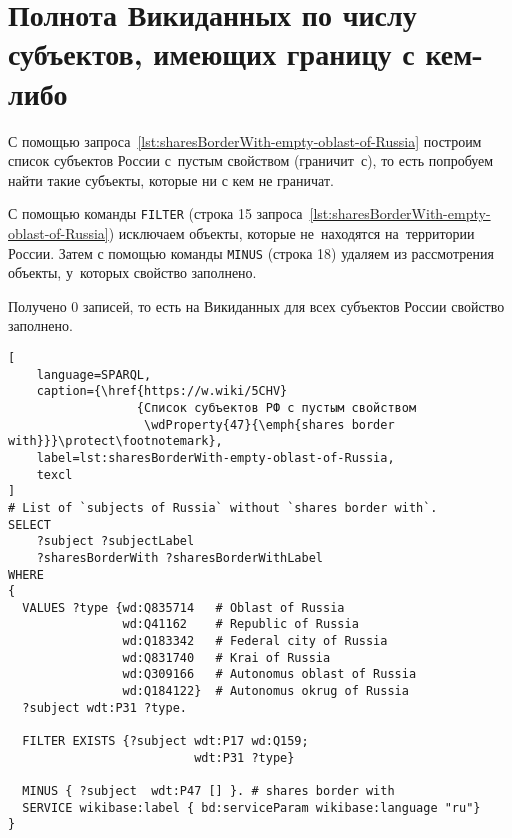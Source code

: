 \newpage
\section{Полнота Викиданных по числу субъектов, имеющих границу с кем-либо} 

С помощью запроса~\ref{lst:sharesBorderWith-empty-oblast-of-Russia} 
построим список субъектов России 
с~пустым свойством  (граничит~с), 
то есть попробуем найти такие субъекты, которые ни с кем не граничат.



С помощью команды \lstinline|FILTER| (строка 15 запроса~\ref{lst:sharesBorderWith-empty-oblast-of-Russia}) 
исключаем объекты, которые не~находятся на~территории России. 
Затем с помощью команды \lstinline|MINUS| (строка 18) удаляем из рассмотрения объекты, 
у~которых свойство  заполнено.

Получено 0 записей, то есть на Викиданных для всех субъектов России свойство  заполнено.

\lstset{numbers=left, firstnumber=1, frame=single}
\begin{lstlisting}[ 
    language=SPARQL, 
    caption={\href{https://w.wiki/5CHV}
                  {Список субъектов РФ с пустым свойством 
                   \wdProperty{47}{\emph{shares border with}}}\protect\footnotemark},
    label=lst:sharesBorderWith-empty-oblast-of-Russia,
    texcl 
]
# List of `subjects of Russia` without `shares border with`. 
SELECT 
    ?subject ?subjectLabel 
    ?sharesBorderWith ?sharesBorderWithLabel
WHERE
{
  VALUES ?type {wd:Q835714   # Oblast of Russia
                wd:Q41162    # Republic of Russia
                wd:Q183342   # Federal city of Russia
                wd:Q831740   # Krai of Russia
                wd:Q309166   # Autonomus oblast of Russia
                wd:Q184122}  # Autonomus okrug of Russia
  ?subject wdt:P31 ?type.
  
  FILTER EXISTS {?subject wdt:P17 wd:Q159; 
                          wdt:P31 ?type}
  
  MINUS { ?subject  wdt:P47 [] }. # shares border with 
  SERVICE wikibase:label { bd:serviceParam wikibase:language "ru"}
}
\end{lstlisting}%



